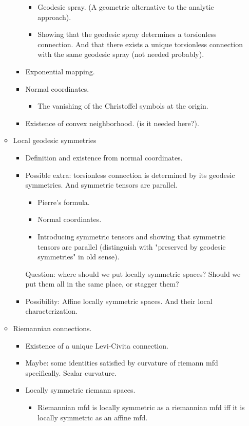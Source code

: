 \documentclass{report}
\theoremstyle{definition}
\begin{document}
\begin{itemize}
\begin{itemize}
\begin{itemize}
            \begin{itemize}
                \item Geodesic spray. (A geometric alternative to the analytic approach).
                \item Showing that the geodesic spray determines a torsionless connection. And that there exists a unique torsionless connection with the same geodesic spray (not needed probably).
            \end{itemize}
            \item Exponential mapping.
            \item Normal coordinates.
            \begin{itemize}
                \item The vanishing of the Christoffel symbols at the origin.
            \end{itemize}
            \item Existence of convex neighborhood. (is it needed here?).
        \end{itemize}
        \item Local geodesic symmetries
        \begin{itemize}
            \item Definition and existence from normal coordinates.
            \item Possible extra: torsionless connection is determined by its geodesic symmetries. And symmetric tensors are parallel.
            \begin{itemize}
                \item Pierre's formula.
                \item Normal coordinates.
                \item Introducing symmetric tensors and showing that symmetric tensors are parallel (distinguish with "preserved by geodesic symmetries" in old sense).
            \end{itemize}
            Question: where should we put locally symmetric spaces? Should we put them all in the same place, or stagger them?
            \item Possibility: Affine locally symmetric spaces. And their local characterization.
        \end{itemize}
        \item Riemannian connections.
        \begin{itemize}
            \item Existence of a unique Levi-Civita connection.
            \item Maybe: some identities satisfied by curvature of riemann mfd specifically. Scalar curvature.
            \item Locally symmetric riemann spaces.
            \begin{itemize}
                \item Riemannian mfd is locally symmetric as a riemannian mfd iff it is locally symmetric as an affine mfd.
            \end{itemize}
        \end{itemize}
    \end{itemize}
\end{itemize}
\end{document}
